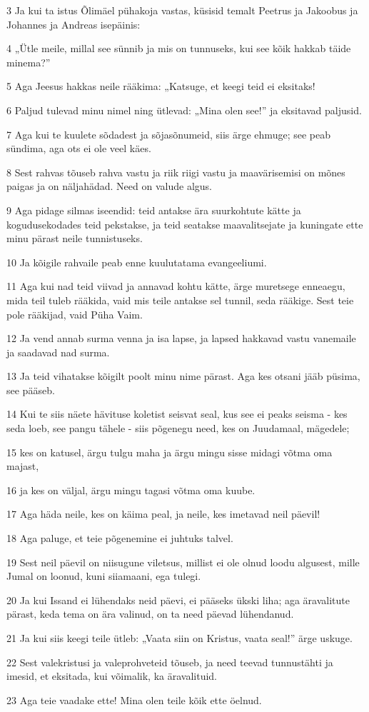 \par 3 Ja kui ta istus Õlimäel pühakoja vastas, küsisid temalt Peetrus ja Jakoobus ja Johannes ja Andreas isepäinis:
\par 4 „Ütle meile, millal see sünnib ja mis on tunnuseks, kui see kõik hakkab täide minema?”
\par 5 Aga Jeesus hakkas neile rääkima: „Katsuge, et keegi teid ei eksitaks!
\par 6 Paljud tulevad minu nimel ning ütlevad: „Mina olen see!” ja eksitavad paljusid.
\par 7 Aga kui te kuulete sõdadest ja sõjasõnumeid, siis ärge ehmuge; see peab sündima, aga ots ei ole veel käes.
\par 8 Sest rahvas tõuseb rahva vastu ja riik riigi vastu ja maavärisemisi on mõnes paigas ja on näljahädad. Need on valude algus.
\par 9 Aga pidage silmas iseendid: teid antakse ära suurkohtute kätte ja kogudusekodades teid pekstakse, ja teid seatakse maavalitsejate ja kuningate ette minu pärast neile tunnistuseks.
\par 10 Ja kõigile rahvaile peab enne kuulutatama evangeeliumi.
\par 11 Aga kui nad teid viivad ja annavad kohtu kätte, ärge muretsege enneaegu, mida teil tuleb rääkida, vaid mis teile antakse sel tunnil, seda rääkige. Sest teie pole rääkijad, vaid Püha Vaim.
\par 12 Ja vend annab surma venna ja isa lapse, ja lapsed hakkavad vastu vanemaile ja saadavad nad surma.
\par 13 Ja teid vihatakse kõigilt poolt minu nime pärast. Aga kes otsani jääb püsima, see pääseb.
\par 14 Kui te siis näete hävituse koletist seisvat seal, kus see ei peaks seisma - kes seda loeb, see pangu tähele - siis põgenegu need, kes on Juudamaal, mägedele;
\par 15 kes on katusel, ärgu tulgu maha ja ärgu mingu sisse midagi võtma oma majast,
\par 16 ja kes on väljal, ärgu mingu tagasi võtma oma kuube.
\par 17 Aga häda neile, kes on käima peal, ja neile, kes imetavad neil päevil!
\par 18 Aga paluge, et teie põgenemine ei juhtuks talvel.
\par 19 Sest neil päevil on niisugune viletsus, millist ei ole olnud loodu algusest, mille Jumal on loonud, kuni siiamaani, ega tulegi.
\par 20 Ja kui Issand ei lühendaks neid päevi, ei pääseks ükski liha; aga äravalitute pärast, keda tema on ära valinud, on ta need päevad lühendanud.
\par 21 Ja kui siis keegi teile ütleb: „Vaata siin on Kristus, vaata seal!” ärge uskuge.
\par 22 Sest valekristusi ja valeprohveteid tõuseb, ja need teevad tunnustähti ja imesid, et eksitada, kui võimalik, ka äravalituid.
\par 23 Aga teie vaadake ette! Mina olen teile kõik ette öelnud.

